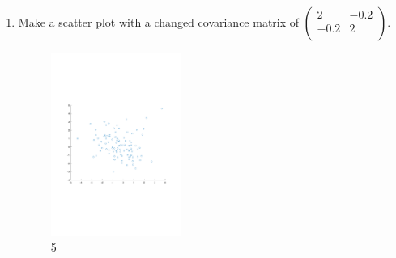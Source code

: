 \documentclass[a4paper]{article}
\theoremstyle{definition}
\newenvironment{soln}{
    \leavevmode\color{blue}\ignorespaces
}{}
\begin{document}
\begin{enumerate}
\begin{soln}
	\end{soln}
\item Make a scatter plot with a changed covariance matrix of $\begin{pmatrix}
    2 & -0.2 \\ -0.2 & 2\\
  \end{pmatrix}$.	\\
  	\begin{soln}
  	    \begin{figure}[h!]
	        		\centering
	   		\includegraphics[width=0.4\textwidth]{85.pdf}  
	   		\captionsetup{labelformat=empty}\caption{5}
		\end{figure}

	\end{soln}
\end{enumerate}





\end{document}
